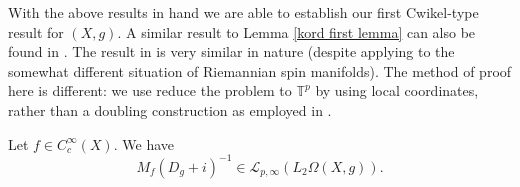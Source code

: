     With the above results in hand we are able to establish our first Cwikel-type result for $(X,g).$ A similar result to Lemma \ref{kord first lemma} can also be found in \cite[Proposition 13]{Rennie-2004}. The result in \cite{Rennie-2004} is very similar in nature (despite applying
    to the somewhat different situation of Riemannian spin manifolds). The method of proof here is different: we use reduce the problem to $\mathbb{T}^p$ by using local coordinates, rather than a doubling construction as employed in \cite{Rennie-2004}.
    
    \begin{lem}\label{kord first lemma} 
        Let $f\in C^{\infty}_c(X).$ We have
        \begin{equation*}
            M_f(D_g+i)^{-1}\in\mathcal{L}_{p,\infty}(L_2\Omega(X,g)).
        \end{equation*}
    \end{lem}
